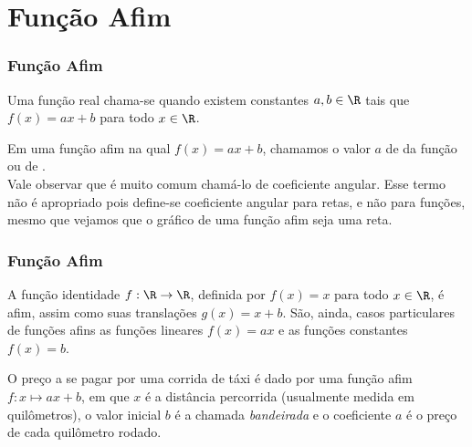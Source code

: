 \section{Função Afim}
\begin{frame}
\frametitle{Função Afim} 

\begin{definicao}
Uma função real chama-se  quando existem constantes $a, b
\in \R$ tais que $f(x) = ax +b$ para todo $x\in \R$.
\end{definicao}

Em uma função afim na qual $f(x) = ax +b$, chamamos o valor $a$ de
 da função ou de .\\
Vale observar que é muito comum chamá-lo de coeficiente angular.
Esse termo não é apropriado pois define-se coeficiente angular para
retas, e não para funções, mesmo que vejamos que o gráfico de uma
função afim seja uma reta. 



\end{frame}


\begin{frame}
\frametitle{Função Afim} 

\begin{exemplo}
    A função identidade $f: \R \to \R$, definida por $f(x) = x$ para
    todo $x \in \R$, é afim, assim como suas translações $g(x) = x+b$.
    São, ainda, casos particulares de funções afins as funções lineares
    $f(x) = ax$ e as funções constantes $f(x) = b$.
    \end{exemplo}\pause

\begin{exemplo}
O preço a se pagar por uma corrida de táxi é dado por uma função
afim $f: x \mapsto ax+b$, em que $x$ é a distância percorrida
(usualmente medida em quilômetros), o valor inicial $b$ é a chamada
\emph{bandeirada} e o coeficiente $a$ é o preço de cada quilômetro
rodado.
\end{exemplo}


\end{frame}


